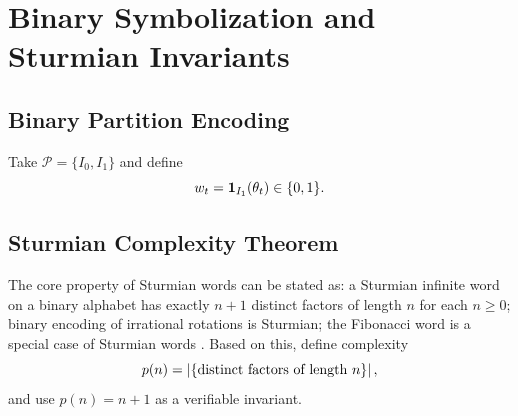 \section{Binary Symbolization and Sturmian Invariants}

\subsection{Binary Partition Encoding}

Take $\mathcal{P}=\{I_0,I_1\}$ and define
\[
w_t=\mathbf{1}_{I_1}(\theta_t)\in\{0,1\}.
\]

\subsection{Sturmian Complexity Theorem}

The core property of Sturmian words can be stated as: a Sturmian infinite word on a binary alphabet has exactly $n+1$ distinct factors of length $n$ for each $n\ge 0$; binary encoding of irrational rotations is Sturmian; the Fibonacci word is a special case of Sturmian words \cite{CambridgeSturmianWordsLothaire}.
Based on this, define complexity
\[
p(n)=\left\lvert \{\text{distinct factors of length }n\}\right\rvert,
\]
and use $p(n)=n+1$ as a verifiable invariant.
